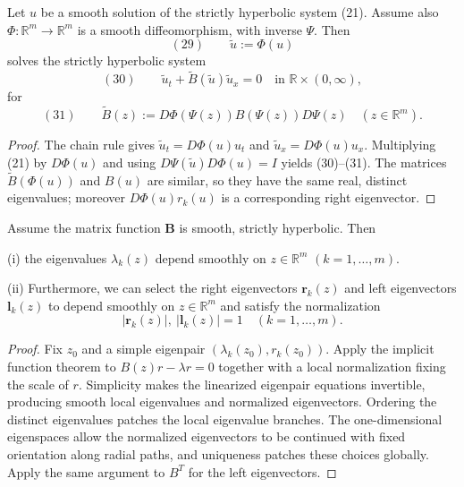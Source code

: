 \begin{theorem}
\label{thm:invariance-hyperbolicity-coordinate-change}
Let $u$ be a smooth solution of the strictly hyperbolic system (21). Assume also $\Phi:\mathbb{R}^m\to\mathbb{R}^m$ is a smooth diffeomorphism, with inverse $\Psi$. Then
$$(29) \qquad \tilde{u} := \Phi(u)$$
solves the strictly hyperbolic system
$$(30) \qquad \tilde u_t + \tilde B(\tilde u)\tilde u_x = 0 \quad \text{in } \mathbb{R}\times(0,\infty),$$
for
$$(31) \qquad \tilde B(z) := D\Phi(\Psi(z))B(\Psi(z))D\Psi(z) \quad (z\in\mathbb{R}^m).$$
\end{theorem}

\begin{proof}
\sketch The chain rule gives $\widetilde u_t=D\Phi(u)u_t$ and $\widetilde u_x=D\Phi(u)u_x$. Multiplying (21) by $D\Phi(u)$ and using $D\Psi(\widetilde u)D\Phi(u)=I$ yields (30)--(31). The matrices $\widetilde B(\Phi(u))$ and $B(u)$ are similar, so they have the same real, distinct eigenvalues; moreover $D\Phi(u)r_k(u)$ is a corresponding right eigenvector.
\end{proof}

\begin{theorem}
\label{thm:smooth-dependence-eigenvalues-eigenvectors}
Assume the matrix function $\mathbf{B}$ is smooth, strictly hyperbolic. Then

(i) the eigenvalues $\lambda_k(z)$ depend smoothly on $z\in\mathbb{R}^m$ $(k=1,\ldots,m)$.

(ii) Furthermore, we can select the right eigenvectors $\mathbf{r}_k(z)$ and left eigenvectors $\mathbf{l}_k(z)$ to depend smoothly on $z\in\mathbb{R}^m$ and satisfy the normalization
$$|\mathbf{r}_k(z)|,\ |\mathbf{l}_k(z)| = 1 \quad (k=1,\ldots,m).$$
\end{theorem}

\begin{proof}
\sketch Fix $z_0$ and a simple eigenpair $(\lambda_k(z_0),r_k(z_0))$. Apply the implicit function theorem to $B(z)r-\lambda r=0$ together with a local normalization fixing the scale of $r$. Simplicity makes the linearized eigenpair equations invertible, producing smooth local eigenvalues and normalized eigenvectors. Ordering the distinct eigenvalues patches the local eigenvalue branches. The one-dimensional eigenspaces allow the normalized eigenvectors to be continued with fixed orientation along radial paths, and uniqueness patches these choices globally. Apply the same argument to $B^T$ for the left eigenvectors.
\end{proof}

